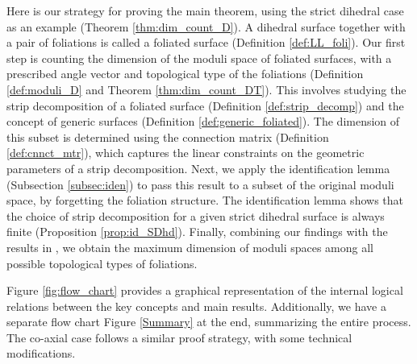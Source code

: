 \documentclass[pdflatex,sn-mathphys]{sn-jnl}%
\numberwithin{equation}{section}
\theoremstyle{thmstyleone}%
\begin{document}
\bigskip
Here is our strategy for proving the main theorem, using the strict dihedral case as an example (Theorem \ref{thm:dim_count_D}). A dihedral surface together with a pair of foliations is called a foliated surface (Definition \ref{def:LL_foli}).
Our first step is counting the dimension of the moduli space of foliated surfaces, with a prescribed angle vector and topological type of the foliations %
(Definition \ref{def:moduli_D} and Theorem \ref{thm:dim_count_DT}).
This involves studying the strip decomposition of a foliated surface (Definition \ref{def:strip_decomp}) and the concept of generic surfaces (Definition \ref{def:generic_foliated}). %
The dimension of this subset is determined using the connection matrix (Definition \ref{def:cnnct_mtr}), which captures the linear constraints on the geometric parameters of a strip decomposition.
Next, we apply the identification lemma (Subsection \ref{subsec:iden}) to pass this result to a subset of the original moduli space, by forgetting the foliation structure. The identification lemma shows that the choice of strip decomposition for a given strict dihedral surface is always finite (Proposition \ref{prop:id_SDhd}). %
Finally, combining our findings with the results in \cite{GT23}, we obtain the maximum dimension of moduli spaces among all possible topological types of foliations.

Figure \ref{fig:flow_chart} provides a graphical representation of the internal logical relations between the key concepts and main results. Additionally, we have a separate flow chart Figure \ref{Summary} at the end, summarizing the entire process. The co-axial case follows a similar proof strategy, with some technical modifications.
\end{document}
